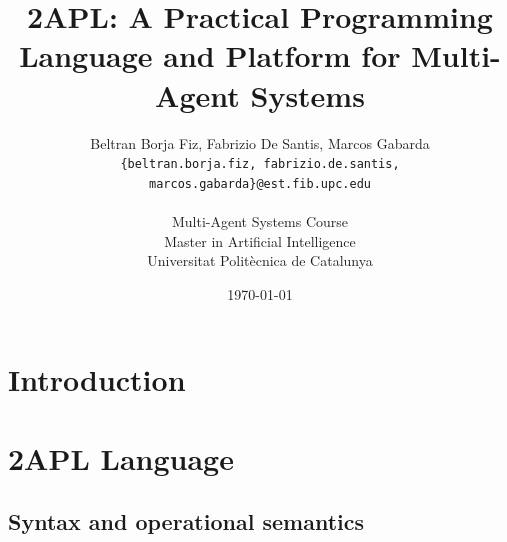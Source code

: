 \documentclass[a4paper]{article}
\begin{document}
\title{2APL: A Practical Programming Language and Platform for Multi-Agent Systems}
 
\author{Beltran Borja Fiz, Fabrizio De Santis, Marcos Gabarda\\
\small \texttt{\{beltran.borja.fiz, fabrizio.de.santis, marcos.gabarda\}@est.fib.upc.edu}\\
\\
Multi-Agent Systems Course\\
Master in Artificial Intelligence\\
Universitat Polit\`ecnica de Catalunya}
\date{\today}

\newenvironment{fminipage}%
  {\begin{Sbox}\begin{minipage}}%
  {\end{minipage}\end{Sbox}\fbox{\TheSbox}}


\maketitle

\tableofcontents

\section{Introduction} %


\section{2APL Language} %




\subsection{Syntax and operational semantics} %
\end{document}
